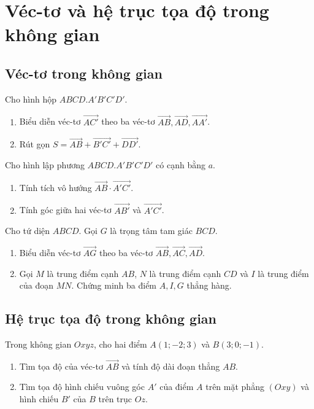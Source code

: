 \chapter{Véc-tơ và hệ trục tọa độ trong không gian}

\section{Véc-tơ trong không gian}

\exercise Cho hình hộp $ABCD.A'B'C'D'$.
\begin{enumerate}
   \item Biểu diễn véc-tơ $\overrightarrow{AC'}$ theo ba véc-tơ $\overrightarrow{AB}, \overrightarrow{AD}, \overrightarrow{AA'}$.
   \item Rút gọn $S = \overrightarrow{AB} + \overrightarrow{B'C'} + \overrightarrow{DD'}$.
\end{enumerate}

\exercise Cho hình lập phương $ABCD.A'B'C'D'$ có cạnh bằng $a$.
\begin{enumerate}
   \item Tính tích vô hướng $\overrightarrow{AB} \cdot \overrightarrow{A'C'}$.
   \item Tính góc giữa hai véc-tơ $\overrightarrow{AB'}$ và $\overrightarrow{A'C'}$.
\end{enumerate}

\exercise Cho tứ diện $ABCD$. Gọi $G$ là trọng tâm tam giác $BCD$.
\begin{enumerate}
   \item Biểu diễn véc-tơ $\overrightarrow{AG}$ theo ba véc-tơ $\overrightarrow{AB}, \overrightarrow{AC}, \overrightarrow{AD}$.
   \item Gọi $M$ là trung điểm cạnh $AB$, $N$ là trung điểm cạnh $CD$ và $I$ là trung điểm của đoạn $MN$. Chứng minh ba điểm $A, I, G$ thẳng hàng.
\end{enumerate}

\section{Hệ trục tọa độ trong không gian}

\exercise Trong không gian $Oxyz$, cho hai điểm $A(1; -2; 3)$ và $B(3; 0; -1)$.
\begin{enumerate}
   \item Tìm tọa độ của véc-tơ $\overrightarrow{AB}$ và tính độ dài đoạn thẳng $AB$.
   \item Tìm tọa độ hình chiếu vuông góc $A'$ của điểm $A$ trên mặt phẳng $(Oxy)$ và hình chiếu $B'$ của $B$ trên trục $Oz$.
\end{enumerate}

